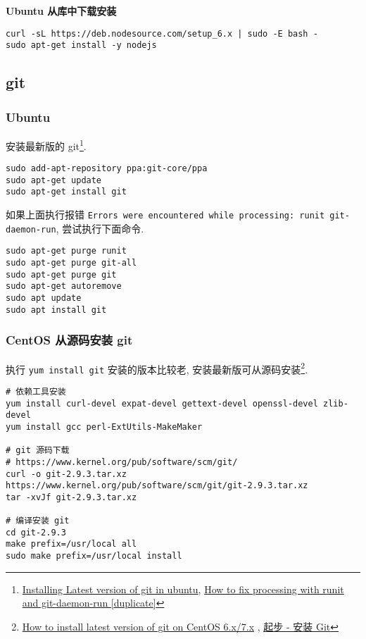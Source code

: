 \textbf{Ubuntu 从库中下载安装}

\begin{lstlisting}
curl -sL https://deb.nodesource.com/setup_6.x | sudo -E bash -
sudo apt-get install -y nodejs
\end{lstlisting}

\subsection{git}\label{git}

\subsubsection{Ubuntu}\label{ubuntu}

安装最新版的 git\footnote{\href{http://stackoverflow.com/questions/19109542/installing-latest-version-of-git-in-ubuntu/19109661\#19109661}{Installing
  Latest version of git in ubuntu},
  \href{http://askubuntu.com/questions/765565/how-to-fix-processing-with-runit-and-git-daemon-run/772095\#772095}{How
  to fix processing with runit and git-daemon-run {[}duplicate{]}}}.

\begin{lstlisting}
sudo add-apt-repository ppa:git-core/ppa
sudo apt-get update
sudo apt-get install git
\end{lstlisting}

如果上面执行报错
\lstinline!Errors were encountered while processing: runit git-daemon-run!,
尝试执行下面命令.

\begin{lstlisting}
sudo apt-get purge runit
sudo apt-get purge git-all
sudo apt-get purge git
sudo apt-get autoremove
sudo apt update
sudo apt install git
\end{lstlisting}

\subsubsection{CentOS 从源码安装
git}\label{centos-ux4eceux6e90ux7801ux5b89ux88c5-git}

执行 \lstinline!yum install git! 安装的版本比较老,
安装最新版可从源码安装\footnote{\href{http://stackoverflow.com/questions/21820715/how-to-install-latest-version-of-git-on-centos-6-x-7-x}{How
  to install latest version of git on CentOS 6.x/7.x} ,
  \href{https://git-scm.com/book/zh/v1/\%E8\%B5\%B7\%E6\%AD\%A5-\%E5\%AE\%89\%E8\%A3\%85-Git}{起步
  - 安装 Git}}.

\begin{lstlisting}
# 依赖工具安装
yum install curl-devel expat-devel gettext-devel openssl-devel zlib-devel
yum install gcc perl-ExtUtils-MakeMaker

# git 源码下载
# https://www.kernel.org/pub/software/scm/git/
curl -o git-2.9.3.tar.xz https://www.kernel.org/pub/software/scm/git/git-2.9.3.tar.xz
tar -xvJf git-2.9.3.tar.xz

# 编译安装 git
cd git-2.9.3
make prefix=/usr/local all
sudo make prefix=/usr/local install
\end{lstlisting}

